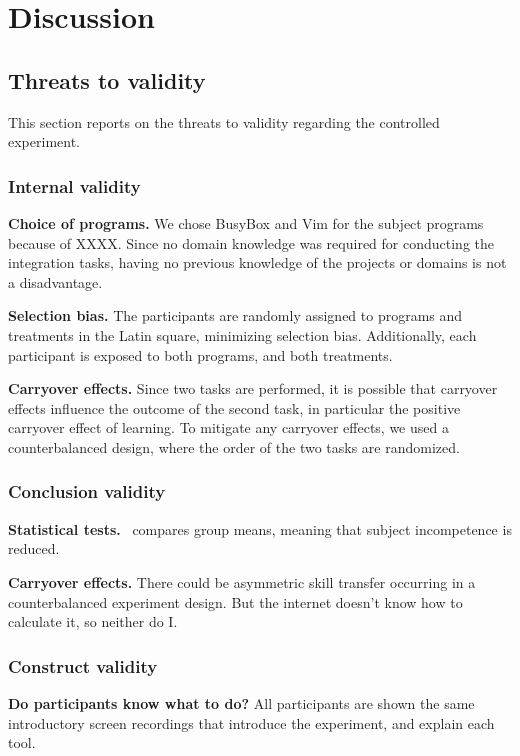 \chapter{Discussion}

\section{Threats to validity}
This section reports on the threats to validity regarding the controlled experiment.

\subsection{Internal validity}
\textbf{Choice of programs.} We chose BusyBox and Vim for the subject programs because of XXXX. 
Since no domain knowledge was required for conducting the integration tasks, having no previous knowledge of the projects or domains is not a disadvantage.

\textbf{Selection bias.} The participants are randomly assigned to programs and treatments in the Latin square, minimizing selection bias. Additionally, each participant is exposed to both programs, and both treatments.

\textbf{Carryover effects.} Since two tasks are performed, it is possible that carryover effects influence the outcome of the second task, in particular the positive carryover effect of learning. To mitigate any carryover effects, we used a counterbalanced design, where the order of the two tasks are randomized.

\subsection{Conclusion validity}
\textbf{Statistical tests.} \anova~compares group means, meaning that subject incompetence is reduced.

\textbf{Carryover effects.} There could be asymmetric skill transfer occurring in a counterbalanced experiment design. But the internet doesn't know how to calculate it, so neither do I.

\subsection{Construct validity}
\textbf{Do participants know what to do?} All participants are shown the same introductory screen recordings that introduce the experiment, and explain each tool.

